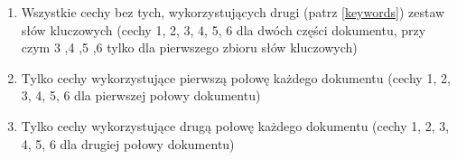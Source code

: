 \documentclass{classrep}
\begin{document}
{{\begin{enumerate}
                    czym 3, 4, 5, 6 tylko dla drugiego zbioru słów kluczowych)
                \item Wszystkie cechy bez tych, wykorzystujących drugi (patrz \ref{keywords}) zestaw
                    słów kluczowych (cechy 1, 2, 3, 4, 5, 6 dla dwóch części dokumentu, przy czym 3
                    ,4 ,5 ,6 tylko dla pierwszego zbioru słów kluczowych)
                \item Tylko cechy wykorzystujące pierwszą połowę każdego dokumentu (cechy 1, 2, 3,
                    4, 5, 6 dla pierwszej połowy dokumentu)
                \item Tylko cechy wykorzystujące drugą połowę każdego dokumentu (cechy 1, 2, 3, 4,
                    5, 6 dla drugiej połowy dokumentu)
            \end{enumerate}
        }
    }
\end{document}
